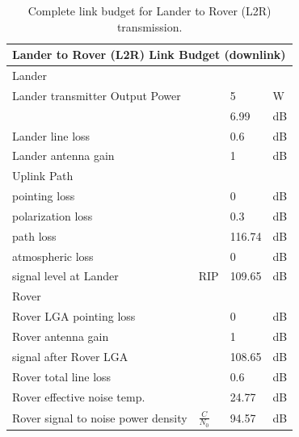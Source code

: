 \begin{table}[]
\centering
\caption{Complete link budget for Lander to Rover (L2R) transmission.}
\label{tab:lb-L2R}
\begin{tabular}{llll}
\multicolumn{4}{l}{Lander to Rover (L2R) Link Budget (downlink)}                 \\ \hline
\multicolumn{4}{l}{\cellcolor[HTML]{DAE8FC}Lander}                               \\
Lander transmitter Output Power           &      & 5                      & W    \\
                                          &      & 6.99                   & dB   \\
Lander line loss                          &      & 0.6                    & dB   \\
Lander antenna gain                       &      & 1                      & dB   \\
\multicolumn{4}{l}{\cellcolor[HTML]{DAE8FC}Uplink Path}                          \\
pointing loss                             &      & 0                      & dB   \\
polarization loss                         &      & 0.3                    & dB   \\
path loss                                 &      & 116.74                 & dB   \\
atmospheric loss                          &      & 0                      & dB   \\ \hline
signal level at Lander					  & RIP  & 109.65				  & dB   \\ 
\multicolumn{4}{l}{\cellcolor[HTML]{DAE8FC}Rover}                                \\
Rover LGA pointing loss                   &      & 0                      & dB   \\
Rover antenna gain                        &      & 1                      & dB   \\ \hline
signal after Rover LGA                    &      & 108.65                 & dB   \\ \hline
Rover total line loss                     &      & 0.6                    & dB   \\
Rover effective noise temp.               &      & 24.77                  & dB   \\ \hline
Rover signal to noise power density       & $\frac{C}{{N}_{0}}$	 & 94.57                  & dB   \\ \hline

\end{tabular}
\end{table}
